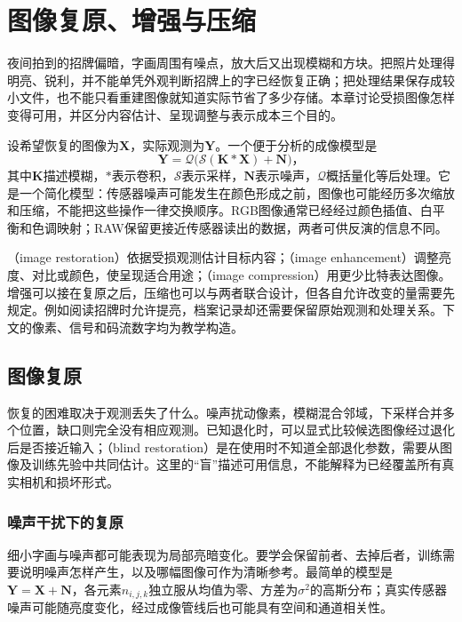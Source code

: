 \chapter{图像复原、增强与压缩}
\label{chap:vision-image-restoration}

夜间拍到的招牌偏暗，字画周围有噪点，放大后又出现模糊和方块。把照片处理得明亮、锐利，并不能单凭外观判断招牌上的字已经恢复正确；把处理结果保存成较小文件，也不能只看重建图像就知道实际节省了多少存储。本章讨论受损图像怎样变得可用，并区分内容估计、呈现调整与表示成本三个目的。

设希望恢复的图像为$\bm{X}$，实际观测为$\bm{Y}$。一个便于分析的成像模型是
\begin{equation}
 \bm{Y}=\mathcal{Q}\bigl(\mathcal{S}(\bm{K}*\bm{X})+\bm{N}\bigr)\text{，}
 \label{eq:vision-image-degradation}
\end{equation}
其中$\bm{K}$描述模糊，$*$表示卷积，$\mathcal{S}$表示采样，$\bm{N}$表示噪声，$\mathcal{Q}$概括量化等后处理。它是一个简化模型：传感器噪声可能发生在颜色形成之前，图像也可能经历多次缩放和压缩，不能把这些操作一律交换顺序。RGB图像通常已经经过颜色插值、白平衡和色调映射；RAW保留更接近传感器读出的数据，两者可供反演的信息不同。

（image restoration）依据受损观测估计目标内容；（image enhancement）调整亮度、对比或颜色，使呈现适合用途；（image compression）用更少比特表达图像。增强可以接在复原之后，压缩也可以与两者联合设计，但各自允许改变的量需要先规定。例如阅读招牌时允许提亮，档案记录却还需要保留原始观测和处理关系。下文的像素、信号和码流数字均为教学构造。

\section{图像复原}
\label{sec:vision-restoration-restoration}

恢复的困难取决于观测丢失了什么。噪声扰动像素，模糊混合邻域，下采样合并多个位置，缺口则完全没有相应观测。已知退化时，可以显式比较候选图像经过退化后是否接近输入；（blind restoration）是在使用时不知道全部退化参数，需要从图像及训练先验中共同估计。这里的“盲”描述可用信息，不能解释为已经覆盖所有真实相机和损坏形式。

\subsection{噪声干扰下的复原}
\label{sec:vision-restoration-denoising}

细小字画与噪声都可能表现为局部亮暗变化。要学会保留前者、去掉后者，训练需要说明噪声怎样产生，以及哪幅图像可作为清晰参考。最简单的模型是$\bm{Y}=\bm{X}+\bm{N}$，各元素$n_{i,j,k}$独立服从均值为零、方差为$\sigma^2$的高斯分布；真实传感器噪声可能随亮度变化，经过成像管线后也可能具有空间和通道相关性。

